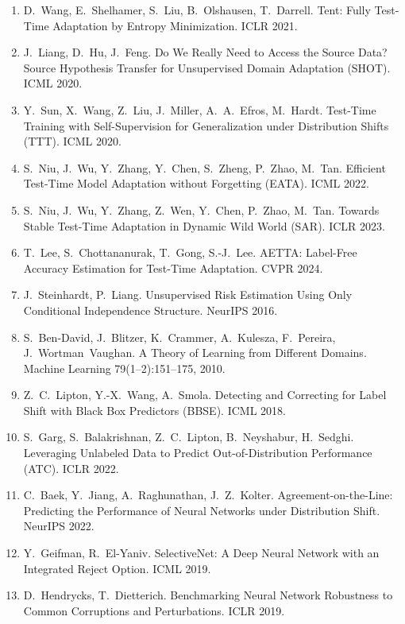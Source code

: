 \documentclass[conference]{IEEEtran}
\theoremstyle{plain}
\theoremstyle{definition}
\begin{document}
\iffalse
\begin{enumerate}\setlength{\itemsep}{1pt}
\item D.~Wang, E.~Shelhamer, S.~Liu, B.~Olshausen, T.~Darrell. Tent: Fully Test-Time Adaptation by Entropy Minimization. ICLR 2021.
\item J.~Liang, D.~Hu, J.~Feng. Do We Really Need to Access the Source Data? Source Hypothesis Transfer for Unsupervised Domain Adaptation (SHOT). ICML 2020.
\item Y.~Sun, X.~Wang, Z.~Liu, J.~Miller, A.~A.~Efros, M.~Hardt. Test-Time Training with Self-Supervision for Generalization under Distribution Shifts (TTT). ICML 2020.
\item S.~Niu, J.~Wu, Y.~Zhang, Y.~Chen, S.~Zheng, P.~Zhao, M.~Tan. Efficient Test-Time Model Adaptation without Forgetting (EATA). ICML 2022.
\item S.~Niu, J.~Wu, Y.~Zhang, Z.~Wen, Y.~Chen, P.~Zhao, M.~Tan. Towards Stable Test-Time Adaptation in Dynamic Wild World (SAR). ICLR 2023.
\item T.~Lee, S.~Chottananurak, T.~Gong, S.-J.~Lee. AETTA: Label-Free Accuracy Estimation for Test-Time Adaptation. CVPR 2024.
\item J.~Steinhardt, P.~Liang. Unsupervised Risk Estimation Using Only Conditional Independence Structure. NeurIPS 2016.
\item S.~Ben-David, J.~Blitzer, K.~Crammer, A.~Kulesza, F.~Pereira, J.~Wortman~Vaughan. A Theory of Learning from Different Domains. Machine Learning 79(1--2):151--175, 2010.
\item Z.~C.~Lipton, Y.-X.~Wang, A.~Smola. Detecting and Correcting for Label Shift with Black Box Predictors (BBSE). ICML 2018.
\item S.~Garg, S.~Balakrishnan, Z.~C.~Lipton, B.~Neyshabur, H.~Sedghi. Leveraging Unlabeled Data to Predict Out-of-Distribution Performance (ATC). ICLR 2022.
\item C.~Baek, Y.~Jiang, A.~Raghunathan, J.~Z.~Kolter. Agreement-on-the-Line: Predicting the Performance of Neural Networks under Distribution Shift. NeurIPS 2022.
\item Y.~Geifman, R.~El-Yaniv. SelectiveNet: A Deep Neural Network with an Integrated Reject Option. ICML 2019.
\item D.~Hendrycks, T.~Dietterich. Benchmarking Neural Network Robustness to Common Corruptions and Perturbations. ICLR 2019.

\end{enumerate}
\end{document}
